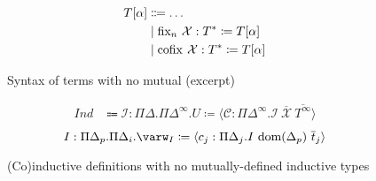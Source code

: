 \begin{figure}
\centering
\begin{align*}
T[\alpha] &\Coloneqq \dots \\
    &\mid \fix*{n}{\mathcal{X}}{T^*}{T[\alpha]} \\
    &\mid \cofix*{}{\mathcal{X}}{T^*}{T[\alpha]}
\end{align*}
\caption{Syntax of \lang terms with no mutual \cofixpoints (excerpt)}
\label{fig:simpl-terms}
\end{figure}

\begin{figure}
\centering
\begin{align*}
\textit{Ind} &\Coloneqq \mathcal{I}: \Pi\Delta . \Pi\Delta^\infty . U \coloneqq \langle \mathcal{C}: \Pi\Delta^\infty . \mathcal{I}\ \overline{\mathcal{X}}\ \overline{T^\infty} \rangle
\end{align*}
\begin{equation*}
I: \Pi\Delta_p. \Pi\Delta_i . \varw_I \coloneqq \langle c_j: \Pi\Delta_j . I\ \dom{\Delta_p}\ \overline{t}_j \rangle
\end{equation*}
\caption{(Co)inductive definitions with no mutually-defined inductive types}
\label{fig:simpl-inductives}
\end{figure}